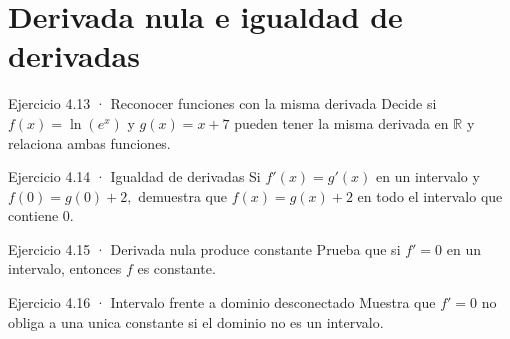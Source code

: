 \documentclass[10pt,a4paper,oneside,openany]{book}
\begin{document}
\section{Derivada nula e igualdad de derivadas}
\begin{PSevenExerciseFixed}{Ejercicio 4.13 · Reconocer funciones con la misma derivada}
Decide si \(f(x)=\ln(e^x)\) y \(g(x)=x+7\) pueden tener la misma derivada en \(\mathbb{R}\) y relaciona ambas funciones.
\end{PSevenExerciseFixed}
\begin{PSevenExerciseFixed}{Ejercicio 4.14 · Igualdad de derivadas}
Si \(f'(x)=g'(x)\) en un intervalo y \(f(0)=g(0)+2,\) demuestra que \(f(x)=g(x)+2\) en todo el intervalo que contiene \(0\).
\end{PSevenExerciseFixed}
\begin{PSevenExerciseFixed}{Ejercicio 4.15 · Derivada nula produce constante}
Prueba que si \(f'=0\) en un intervalo, entonces \(f\) es constante.
\end{PSevenExerciseFixed}
\begin{PSevenExerciseFixed}{Ejercicio 4.16 · Intervalo frente a dominio desconectado}
Muestra que \(f'=0\) no obliga a una unica constante si el dominio no es un intervalo.
\end{PSevenExerciseFixed}
\end{document}
